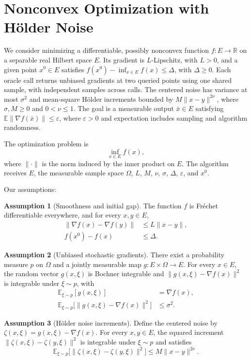 \documentclass[10pt]{article}
\theoremstyle{definition}
\newtheorem{assumption}{Assumption}
\begin{document}
\section*{Nonconvex Optimization with H\"older Noise}
We consider minimizing a differentiable, possibly nonconvex function $f:E\to\mathbb{R}$ on a separable real Hilbert space $E$. Its gradient is $L$-Lipschitz, with $L>0$, and a given point $x^0\in E$ satisfies $f(x^0)-\inf_{x\in E}f(x)\leq\Delta$, with $\Delta\geq0$. Each oracle call returns unbiased gradients at two queried points using one shared sample, with independent samples across calls. The centered noise has variance at most $\sigma^2$ and mean-square H\"older increments bounded by $M\|x-y\|^{2\nu}$, where $\sigma,M\geq0$ and $0<\nu\leq1$. The goal is a measurable output $\bar{x}\in E$ satisfying $\mathbb{E}\|\nabla f(\bar{x})\|\leq\varepsilon$, where $\varepsilon>0$ and expectation includes sampling and algorithm randomness.

The optimization problem is
\[
\inf_{x\in E} f(x),
\]
where $\|\cdot\|$ is the norm induced by the inner product on $E$. The algorithm receives $E$, the measurable sample space $\Omega$, $L$, $M$, $\nu$, $\sigma$, $\Delta$, $\varepsilon$, and $x^0$.

Our assumptions:
\begin{assumption}[Smoothness and initial gap]
The function $f$ is Fr\'echet differentiable everywhere, and for every $x,y\in E$,
\[
\begin{aligned}
\|\nabla f(x)-\nabla f(y)\|&\leq L\|x-y\|,\\
f(x^0)-f(x)&\leq\Delta.
\end{aligned}
\]
\end{assumption}

\begin{assumption}[Unbiased stochastic gradients]
There exist a probability measure $p$ on $\Omega$ and a jointly measurable map $g:E\times\Omega\to E$. For every $x\in E$, the random vector $g(x,\xi)$ is Bochner integrable and $\|g(x,\xi)-\nabla f(x)\|^2$ is integrable under $\xi\sim p$, with
\[
\begin{aligned}
\mathbb{E}_{\xi\sim p}[g(x,\xi)]&=\nabla f(x),\\
\mathbb{E}_{\xi\sim p}\bigl[\|g(x,\xi)-\nabla f(x)\|^2\bigr]
&\leq\sigma^2.
\end{aligned}
\]
\end{assumption}

\begin{assumption}[H\"older noise increments]
Define the centered noise by $\zeta(x,\xi)=g(x,\xi)-\nabla f(x)$. For every $x,y\in E$, the squared increment $\|\zeta(x,\xi)-\zeta(y,\xi)\|^2$ is integrable under $\xi\sim p$ and satisfies
\[
\mathbb{E}_{\xi\sim p}\bigl[\|\zeta(x,\xi)-\zeta(y,\xi)\|^2\bigr]
\leq M\|x-y\|^{2\nu}.
\]
\end{assumption}
\end{document}
